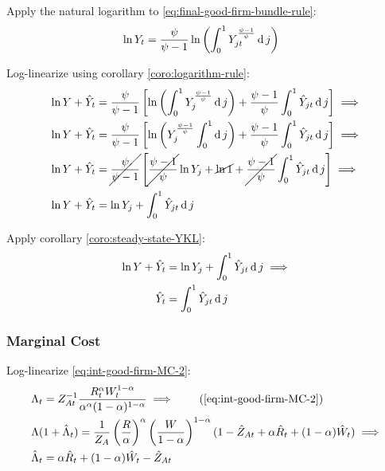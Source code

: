 \documentclass[
	thesis.tex
	]{subfiles}
\begin{document}
Apply the natural logarithm to \ref{eq:final-good-firm-bundle-rule}:
\begin{align}
	\ln Y_t &= \frac{\psi}{\psi-1} \ln \left( \int_{0}^{1} Y_{jt}^{\frac{\psi-1}{\psi}} \operatorname{d} j \right) \nonumber
\end{align}

Log-linearize using corollary \ref{coro:logarithm-rule}:
\begin{align}
	\ln Y + \hat{Y}_t &= \frac{\psi}{\psi-1} \left[ \ln \left( \int_{0}^{1} Y_{j}^{\frac{\psi-1}{\psi}} \operatorname{d} j \right) + \frac{\psi-1}{\psi} \int_{0}^{1} \hat{Y}_{jt} \operatorname{d} j \right] \implies \nonumber
	\\
	\ln Y + \hat{Y}_t &= \frac{\psi}{\psi-1} \left[ \ln \left( Y_{j}^{\frac{\psi-1}{\psi}} \int_{0}^{1} \operatorname{d} j \right) + \frac{\psi-1}{\psi} \int_{0}^{1} \hat{Y}_{jt} \operatorname{d} j \right] \implies \nonumber
	\\
	\ln Y + \hat{Y}_t &= \cancel{\frac{\psi}{\psi-1}} \left[ \cancel{\frac{\psi-1}{\psi}} \ln Y_{j} + \cancel{\ln1} + \cancel{\frac{\psi-1}{\psi}} \int_{0}^{1} \hat{Y}_{jt} \operatorname{d} j \right] \implies \nonumber
	\\
	\ln Y + \hat{Y}_t &= \ln Y_{j} + \int_{0}^{1} \hat{Y}_{jt} \operatorname{d} j \nonumber
\end{align}

Apply corollary \ref{coro:steady-state-YKL}:
\begin{align}
	\ln Y + \hat{Y}_t &= \ln Y_{j} + \int_{0}^{1} \hat{Y}_{jt} \operatorname{d} j \implies \nonumber \\
	\hat{Y}_t &= \int_{0}^{1} \hat{Y}_{jt} \operatorname{d} j 
	\label{eq:ll-final-good-firm-bundle-rule}
\end{align}


\subsubsection{Marginal Cost}

Log-linearize \ref{eq:int-good-firm-MC-2}:
\begin{alignat}{2}
	& \Lambda_t = Z_{At}^{-1} \frac{R_t^{\alpha} W_t^{1-\alpha} }{ \alpha^{\alpha} (1-\alpha)^{1-\alpha} } \implies \tag{\ref{eq:int-good-firm-MC-2}} \\
	& \Lambda (1+ \hat{\Lambda}_t) = \frac{1}{Z_{A}} \left( \frac{R}{\alpha} \right)^{\alpha} \left( \frac{W}{1-\alpha} \right)^{1-\alpha} (1- \hat{Z}_{At} + \alpha \hat{R}_t + (1- \alpha) \hat{W}_t ) \implies \nonumber \\
	& \hat{\Lambda}_t = \alpha \hat{R}_t + (1- \alpha) \hat{W}_t - \hat{Z}_{At} \label{eq:ll-int-good-firm-MC-2}
\end{alignat}
\end{document}
